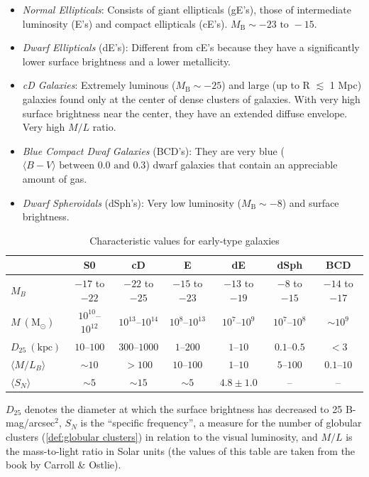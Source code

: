 \documentclass[a4paper,11pt]{report}
\newcommand{\ti}[1]{\textit{#1}}
\newcommand{\MB}{M_\text{B}}
\begin{document}
\begin{itemize}
  \item \ti{Normal Ellipticals}: Consists of giant ellipticals (gE's), those of intermediate luminosity (E's) and compact ellipticals (cE's). $M_\text{B} \sim -23 \text{ to } -15$.
  \item \ti{Dwarf Ellipticals} (dE's): Different from cE's because they have a significantly lower surface brightness and a lower metallicity.
  \item \ti{cD Galaxies}: Extremely luminous ($\MB \sim -25$) and large (up to R $\lesssim$ 1 Mpc) galaxies found only at the center of dense clusters of galaxies. With very high surface brightness near the center, they have an extended diffuse envelope. Very high $M/L$ ratio.
  \item \ti{Blue Compact Dwaf Galaxies} (BCD's): They are very blue ($\langle B - V \rangle \text{ between 0.0 and 0.3}$) dwarf galaxies that contain an appreciable amount of gas.
  \item \ti{Dwarf Spheroidals} (dSph's): Very low luminosity ($\MB \sim -8$) and surface brightness.
\end{itemize}

\begin{table}[h!]
\centering
\caption{Characteristic values for early-type galaxies}
\begin{tabular}{lcccccc}
\hline
 & S0 & cD & E & dE & dSph & BCD \\
\hline
$M_B$ 
& $-17$ to $-22$ 
& $-22$ to $-25$ 
& $-15$ to $-23$ 
& $-13$ to $-19$ 
& $-8$ to $-15$ 
& $-14$ to $-17$ \\

$M\ (\mathrm{M}_\odot)$ 
& $10^{10}$--$10^{12}$ 
& $10^{13}$--$10^{14}$ 
& $10^{8}$--$10^{13}$ 
& $10^{7}$--$10^{9}$ 
& $10^{7}$--$10^{8}$ 
& $\sim 10^{9}$ \\

$D_{25}\ (\mathrm{kpc})$ 
& $10$--$100$ 
& $300$--$1000$ 
& $1$--$200$ 
& $1$--$10$ 
& $0.1$--$0.5$ 
& $<3$ \\

$\langle M/L_B \rangle$ 
& $\sim 10$ 
& $>100$ 
& $10$--$100$ 
& $1$--$10$ 
& $5$--$100$ 
& $0.1$--$10$ \\

$\langle S_N \rangle$ 
& $\sim 5$ 
& $\sim 15$ 
& $\sim 5$ 
& $4.8 \pm 1.0$ 
& -- 
& -- \\
\hline
\end{tabular}

\vspace{0.3cm}

\begin{minipage}{\textwidth}
\small
  $D_{25}$ denotes the diameter at which the surface brightness has decreased to 25 B-mag/arcsec$^2$, $S_N$ is the ``specific frequency'', a measure for the number of globular clusters (\ref{def:globular clusters}) in relation to the visual luminosity, and $M/L$ is the mass-to-light ratio in Solar units (the values of this table are taken from the book by Carroll \& Ostlie).
\end{minipage}
\end{table}
\end{document}
